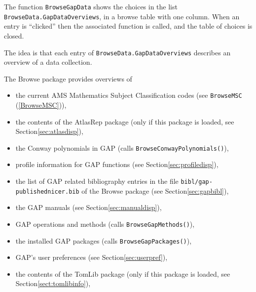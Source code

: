 \documentclass[a4paper,11pt]{report}
\begin{document}
{{{ The function \texttt{BrowseGapData} shows the choices in the list \texttt{BrowseData.GapDataOverviews}, in a browse table with one column. When an entry is ``clicked'' then the associated function is called, and the table of choices is closed. 

 The idea is that each entry of \texttt{BrowseData.GapDataOverviews} describes an overview of a data collection. 

 The \textsf{Browse} package provides overviews of 
\begin{itemize}
\item  the current AMS Mathematics Subject Classification codes (see \texttt{BrowseMSC} (\ref{BrowseMSC})), 
\item  the contents of the \textsf{AtlasRep} package \cite{AtlasRep} (only if this package is loaded, see Section{\nobreakspace}\ref{sec:atlasdisp}), 
\item  {} the Conway polynomials in \textsf{GAP} (calls \texttt{BrowseConwayPolynomials()}), 
\item  profile information for \textsf{GAP} functions (see Section{\nobreakspace}\ref{sec:profiledisp}), 
\item  the list of \textsf{GAP} related bibliography entries in the file \texttt{bibl/gap-publishednicer.bib} of the \textsf{Browse} package (see Section{\nobreakspace}\ref{sec:gapbibl}), 
\item  the \textsf{GAP} manuals (see Section{\nobreakspace}\ref{sec:manualdisp}), 
\item  {} \textsf{GAP} operations and methods (calls \texttt{BrowseGapMethods()}), 
\item  {} the installed \textsf{GAP} packages (calls \texttt{BrowseGapPackages()}), 
\item  \textsf{GAP}'s user preferences (see Section{\nobreakspace}\ref{sec:userpref}), 
\item  the contents of the \textsf{TomLib} package \cite{TomLib} (only if this package is loaded, see Section{\nobreakspace}\ref{sect:tomlibinfo}), 
\end{itemize}
 

}}}
\end{document}
